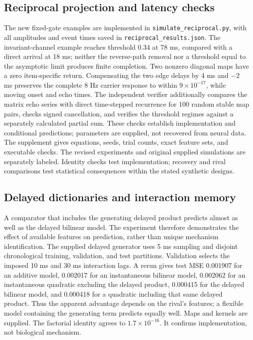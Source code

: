 \documentclass[submission,nolinenumbers]{esj}
\begin{document}
\subsection{Reciprocal projection and latency checks}\label{sec:reciprocal-checks}
The new fixed-gate examples are implemented in \texttt{simulate\_reciprocal.py}, with all amplitudes and event times saved in \texttt{reciprocal\_results.json}. The invariant-channel example reaches threshold 0.34 at 78 ms, compared with a direct arrival at 18 ms; neither the reverse-path removal nor a threshold equal to the asymptotic limit produces finite completion. Two nonzero diagonal maps have a zero item-specific return. Compensating the two edge delays by 4 ms and $-2$ ms preserves the complete 8 Hz carrier response to within $9\times10^{-17}$, while moving onset and echo times. The independent verifier additionally compares the matrix echo series with direct time-stepped recurrence for 100 random stable map pairs, checks signed cancellation, and verifies the threshold regimes against a separately calculated partial sum. These checks establish implementation and conditional predictions; parameters are supplied, not recovered from neural data.
The supplement gives equations, seeds, trial counts, exact feature sets, and executable checks. The revised experiments and original supplied simulations are separately labeled. Identity checks test implementation; recovery and rival comparisons test statistical consequences within the stated synthetic designs.

\subsection{Delayed dictionaries and interaction memory}\label{sec:delayresults}
A comparator that includes the generating delayed product predicts almost as well as the delayed bilinear model. The experiment therefore demonstrates the effect of available features on prediction, rather than unique mechanism identification.
The supplied delayed generator uses 5 ms sampling and disjoint chronological training, validation, and test partitions. Validation selects the imposed 10 ms and 30 ms interaction lags. A rerun gives test MSE 0.001907 for an additive model, 0.002017 for an instantaneous bilinear model, 0.002062 for an instantaneous quadratic excluding the delayed product, 0.000415 for the delayed bilinear model, and 0.000418 for a quadratic including that same delayed product. Thus the apparent advantage depends on the rival's features; a flexible model containing the generating term predicts equally well. Maps and kernels are supplied. The factorial identity agrees to $1.7\times10^{-16}$. It confirms implementation, not biological mechanism.
\end{document}
